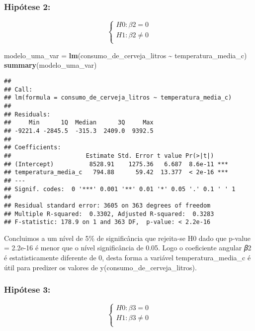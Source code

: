 \documentclass[
]{article}
\newenvironment{Shaded}{\begin{snugshade}}{\end{snugshade}}
\newcommand{\FunctionTok}[1]{\textcolor[rgb]{0.13,0.29,0.53}{\textbf{#1}}}
\newcommand{\NormalTok}[1]{#1}
\newcommand{\OtherTok}[1]{\textcolor[rgb]{0.56,0.35,0.01}{#1}}
\newcommand{\SpecialCharTok}[1]{\textcolor[rgb]{0.81,0.36,0.00}{\textbf{#1}}}
\begin{document}
\hypertarget{hipuxf3tese-2}{%
\subsubsection{Hipótese 2:}\label{hipuxf3tese-2}}

\[
\left\{ \begin{array}{rc} 
H0: \beta2 = 0 \\ 
H1: \beta2 \neq 0 \\ 
\end{array}\right.
\]

\begin{Shaded}
\begin{Highlighting}[]
\NormalTok{modelo\_uma\_var }\OtherTok{=} \FunctionTok{lm}\NormalTok{(consumo\_de\_cerveja\_litros }\SpecialCharTok{\textasciitilde{}}\NormalTok{ temperatura\_media\_c)}
\FunctionTok{summary}\NormalTok{(modelo\_uma\_var)}
\end{Highlighting}
\end{Shaded}

\begin{verbatim}
## 
## Call:
## lm(formula = consumo_de_cerveja_litros ~ temperatura_media_c)
## 
## Residuals:
##     Min      1Q  Median      3Q     Max 
## -9221.4 -2845.5  -315.3  2409.0  9392.5 
## 
## Coefficients:
##                     Estimate Std. Error t value Pr(>|t|)    
## (Intercept)          8528.91    1275.36   6.687  8.6e-11 ***
## temperatura_media_c   794.88      59.42  13.377  < 2e-16 ***
## ---
## Signif. codes:  0 '***' 0.001 '**' 0.01 '*' 0.05 '.' 0.1 ' ' 1
## 
## Residual standard error: 3605 on 363 degrees of freedom
## Multiple R-squared:  0.3302, Adjusted R-squared:  0.3283 
## F-statistic: 178.9 on 1 and 363 DF,  p-value: < 2.2e-16
\end{verbatim}

Concluimos a um nível de 5\% de significância que rejeita-se H0 dado que
p-value = 2.2e-16 é menor que o nível significância de 0.05. Logo o
coeficiente angular 𝛽2 é estatisticamente diferente de 0, desta forma a
variável temperatura\_media\_c é útil para predizer os valores de
y(consumo\_de\_cerveja\_litros).

\hypertarget{hipuxf3tese-3}{%
\subsubsection{Hipótese 3:}\label{hipuxf3tese-3}}

\[
\left\{ \begin{array}{rc} 
H0: \beta3 = 0 \\ 
H1: \beta3 \neq 0 \\ 
\end{array}\right.
\]
\end{document}
